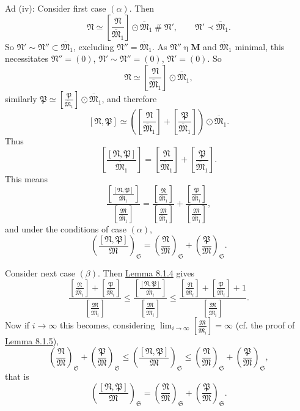 \documentclass[12pt,b5paper,twoside]{article}
\newcommand{\M}{\mathbf M}
\newcommand{\reldiv}[2]{\left[\frac{#1}{#2}\right]}
\newcommand{\lemref}[1]{\hyperref[lem:#1]{Lemma #1}}
\begin{document}
Ad (iv): Consider first case $(\alpha)$. Then
\[
 \mathfrak N\simeq
 \reldiv{\mathfrak N}{\overline{\mathfrak M}_1}
 \odot\overline{\mathfrak M}_1\mathbin{\#}\mathfrak N',
 \qquad \mathfrak N'\prec\overline{\mathfrak M}_1.
\]
So $\mathfrak N'\sim\mathfrak N''\subset\overline{\mathfrak M}_1$, excluding
$\mathfrak N''=\overline{\mathfrak M}_1$. As
$\mathfrak N''\mathbin\eta\M$ and $\overline{\mathfrak M}_1$ minimal, this
necessitates $\mathfrak N''=(0)$, $\mathfrak N'\sim\mathfrak N''=(0)$,
$\mathfrak N'=(0)$. So
\[
 \mathfrak N\simeq
 \reldiv{\mathfrak N}{\overline{\mathfrak M}_1}
 \odot\overline{\mathfrak M}_1,
\]
similarly
$\mathfrak P\simeq\reldiv{\mathfrak P}{\overline{\mathfrak M}_1}
\odot\overline{\mathfrak M}_1$, and therefore
\[
 [\mathfrak N,\mathfrak P]\simeq
 \left(
   \reldiv{\mathfrak N}{\overline{\mathfrak M}_1}
  +\reldiv{\mathfrak P}{\overline{\mathfrak M}_1}
 \right)\odot\overline{\mathfrak M}_1.
\]
Thus
\[
 \reldiv{[\mathfrak N,\mathfrak P]}{\overline{\mathfrak M}_1}
 =\reldiv{\mathfrak N}{\overline{\mathfrak M}_1}
 +\reldiv{\mathfrak P}{\overline{\mathfrak M}_1}.
\]
This means
\[
 \frac{\reldiv{[\mathfrak N,\mathfrak P]}{\overline{\mathfrak M}_1}}
      {\reldiv{\mathfrak M}{\overline{\mathfrak M}_1}}
 =
 \frac{\reldiv{\mathfrak N}{\overline{\mathfrak M}_1}}
      {\reldiv{\mathfrak M}{\overline{\mathfrak M}_1}}
 +
 \frac{\reldiv{\mathfrak P}{\overline{\mathfrak M}_1}}
      {\reldiv{\mathfrak M}{\overline{\mathfrak M}_1}},
\]
and under the conditions of case $(\alpha)$,
\[
 \left(\frac{[\mathfrak N,\mathfrak P]}{\mathfrak M}\right)_{\mathfrak S}
 =\left(\frac{\mathfrak N}{\mathfrak M}\right)_{\mathfrak S}
 +\left(\frac{\mathfrak P}{\mathfrak M}\right)_{\mathfrak S}.
\]

Consider next case $(\beta)$. Then \lemref{8.1.4} gives
\[
 \frac{
   \reldiv{\mathfrak N}{\overline{\mathfrak M}_i}
  +\reldiv{\mathfrak P}{\overline{\mathfrak M}_i}}
  {\reldiv{\mathfrak M}{\overline{\mathfrak M}_i}}
 \leq
 \frac{\reldiv{[\mathfrak N,\mathfrak P]}{\overline{\mathfrak M}_i}}
      {\reldiv{\mathfrak M}{\overline{\mathfrak M}_i}}
 \leq
 \frac{
   \reldiv{\mathfrak N}{\overline{\mathfrak M}_i}
  +\reldiv{\mathfrak P}{\overline{\mathfrak M}_i}+1}
  {\reldiv{\mathfrak M}{\overline{\mathfrak M}_i}}.
\]
Now if $i\to\infty$ this becomes, considering
$\lim_{i\to\infty}\reldiv{\mathfrak M}{\overline{\mathfrak M}_i}=\infty$
(cf. the proof of \lemref{8.1.5}),
\[
 \left(\frac{\mathfrak N}{\mathfrak M}\right)_{\mathfrak S}
 +\left(\frac{\mathfrak P}{\mathfrak M}\right)_{\mathfrak S}
 \leq
 \left(\frac{[\mathfrak N,\mathfrak P]}{\mathfrak M}\right)_{\mathfrak S}
 \leq
 \left(\frac{\mathfrak N}{\mathfrak M}\right)_{\mathfrak S}
 +\left(\frac{\mathfrak P}{\mathfrak M}\right)_{\mathfrak S},
\]
that is
\[
 \left(\frac{[\mathfrak N,\mathfrak P]}{\mathfrak M}\right)_{\mathfrak S}
 =\left(\frac{\mathfrak N}{\mathfrak M}\right)_{\mathfrak S}
 +\left(\frac{\mathfrak P}{\mathfrak M}\right)_{\mathfrak S}.
\]
\end{document}
